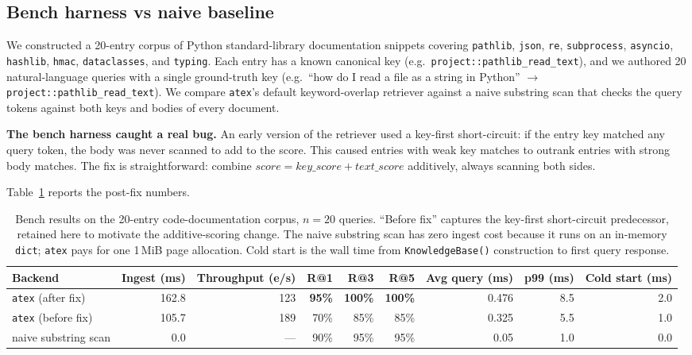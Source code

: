 \documentclass[10pt,letterpaper]{article}
\begin{document}
\subsection{Bench harness vs naive baseline}

We constructed a 20-entry corpus of Python standard-library documentation snippets covering \texttt{pathlib}, \texttt{json}, \texttt{re}, \texttt{subprocess}, \texttt{asyncio}, \texttt{hashlib}, \texttt{hmac}, \texttt{dataclasses}, and \texttt{typing}. Each entry has a known canonical key (e.g.\ \texttt{project::pathlib\_read\_text}), and we authored 20 natural-language queries with a single ground-truth key (e.g.\ ``how do I read a file as a string in Python'' $\to$ \texttt{project::pathlib\_read\_text}). We compare \texttt{atex}'s default keyword-overlap retriever against a naive substring scan that checks the query tokens against both keys and bodies of every document.

\textbf{The bench harness caught a real bug.} An early version of the retriever used a key-first short-circuit: if the entry key matched any query token, the body was never scanned to add to the score. This caused entries with weak key matches to outrank entries with strong body matches. The fix is straightforward: combine $\textit{score} = \textit{key\_score} + \textit{text\_score}$ additively, always scanning both sides.

Table~\ref{tab:bench} reports the post-fix numbers.

\begin{table}[t]
\centering
\small
\begin{tabular}{lrrrrrrrr}
\toprule
\textbf{Backend} & \textbf{Ingest (ms)} & \textbf{Throughput (e/s)} & \textbf{R@1} & \textbf{R@3} & \textbf{R@5} & \textbf{Avg query (ms)} & \textbf{p99 (ms)} & \textbf{Cold start (ms)} \\
\midrule
\texttt{atex} (after fix) & 162.8 & 123 & \textbf{95\%} & \textbf{100\%} & \textbf{100\%} & 0.476 & 8.5 & 2.0 \\
\texttt{atex} (before fix) & 105.7 & 189 & 70\% & 85\% & 85\% & 0.325 & 5.5 & 1.0 \\
naive substring scan & 0.0 & --- & 90\% & 95\% & 95\% & 0.05 & 1.0 & 0.0 \\
\bottomrule
\end{tabular}
\caption{Bench results on the 20-entry code-documentation corpus, $n=20$ queries. ``Before fix'' captures the key-first short-circuit predecessor, retained here to motivate the additive-scoring change. The naive substring scan has zero ingest cost because it runs on an in-memory \texttt{dict}; \texttt{atex} pays for one 1\,MiB page allocation. Cold start is the wall time from \texttt{KnowledgeBase()} construction to first query response.}
\label{tab:bench}
\end{table}
\end{document}
